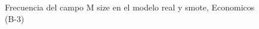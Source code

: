 \begin{figure}[H]
    \centering
    
    \caption{Frecuencia del campo M size en el modelo real y smote, Economicos (B-3)}
    \label{frecuency-M Size-smote-enc}
\end{figure}